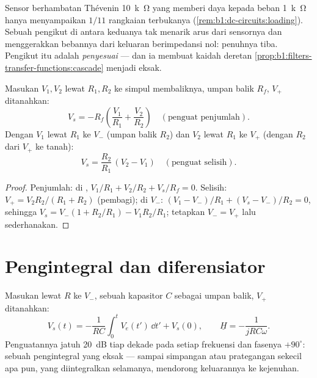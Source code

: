 \begin{example}\label{ex:b1:operational-amplifier:follower}
Sensor berhambatan Thévenin \qty{10}{k\ohm} yang memberi daya kepada
beban \qty{1}{k\ohm} hanya menyampaikan $1/11$  rangkaian
terbukanya (\cref{rem:b1:dc-circuits:loading}). Sebuah pengikut di
antara keduanya tak menarik arus dari sensornya dan menggerakkan
bebannya dari keluaran berimpedansi nol:  penuhnya tiba.
Pengikut itu adalah \emph{penyesuai } --- dan ia membuat kaidah
deretan \cref{prop:b1:filters-transfer-functions:cascade} menjadi eksak.
\end{example}

\begin{proposition}\label{prop:b1:operational-amplifier:sumdiff}
Masukan $V_1, V_2$ lewat $R_1, R_2$ ke simpul membaliknya, umpan balik
$R_f$, $V_+$ ditanahkan:
\[
V_s = -R_f\left(\frac{V_1}{R_1} + \frac{V_2}{R_2}\right)
\quad (\text{penguat penjumlah}).
\]
Dengan $V_1$ lewat $R_1$ ke $V_-$ (umpan balik $R_2$) dan $V_2$ lewat
$R_1$ ke $V_+$ (dengan $R_2$ dari $V_+$ ke tanah):
\[
V_s = \frac{R_2}{R_1}\,(V_2 - V_1)
\quad (\text{penguat selisih}).
\]
\end{proposition}

\begin{proof}
Penjumlah:  di , $V_1/R_1 + V_2/R_2 + V_s/R_f =
0$. Selisih: $V_+ = V_2R_2/(R_1 + R_2)$ (pembagi);  di $V_-$:
$(V_1 - V_-)/R_1 + (V_s - V_-)/R_2 = 0$, sehingga $V_s = V_-(1 + R_2/R_1) -
V_1R_2/R_1$; tetapkan $V_- = V_+$ lalu sederhanakan.
\end{proof}

\section{Pengintegral dan diferensiator}

\begin{proposition}[Pengintegral]\label{prop:b1:operational-amplifier:integrator}
Masukan lewat $R$ ke $V_-$, sebuah kapasitor $C$ sebagai umpan balik,
$V_+$ ditanahkan:
\[
V_s(t) = -\frac{1}{RC}\int_0^t V_e(t')\,\dd t' + V_s(0),
\qquad
\underline H = -\frac{1}{jRC\omega} .
\]
Penguatannya jatuh \qty{20}{dB} tiap dekade pada setiap frekuensi dan
fasenya $+90^\circ$: sebuah pengintegral yang eksak --- sampai
simpangan atau prategangan sekecil apa pun, yang diintegralkan
selamanya, mendorong keluarannya ke kejenuhan.
\end{proposition}

